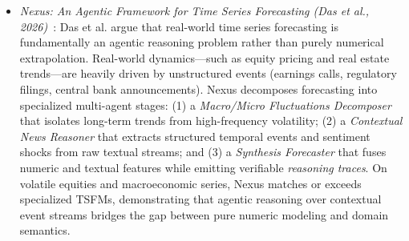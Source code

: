 \begin{itemize}[leftmargin=*]
    \item \emph{Nexus: An Agentic Framework for Time Series Forecasting (Das et al., 2026)}~\cite{das2026nexus}: Das et al. argue that real-world time series forecasting is fundamentally an agentic reasoning problem rather than purely numerical extrapolation. Real-world dynamics—such as equity pricing and real estate trends—are heavily driven by unstructured events (earnings calls, regulatory filings, central bank announcements). Nexus decomposes forecasting into specialized multi-agent stages:
    (1) a \emph{Macro/Micro Fluctuations Decomposer} that isolates long-term trends from high-frequency volatility;
    (2) a \emph{Contextual News Reasoner} that extracts structured temporal events and sentiment shocks from raw textual streams; and
    (3) a \emph{Synthesis Forecaster} that fuses numeric and textual features while emitting verifiable \emph{reasoning traces}. On volatile equities and macroeconomic series, Nexus matches or exceeds specialized TSFMs, demonstrating that agentic reasoning over contextual event streams bridges the gap between pure numeric modeling and domain semantics.
\end{itemize}


